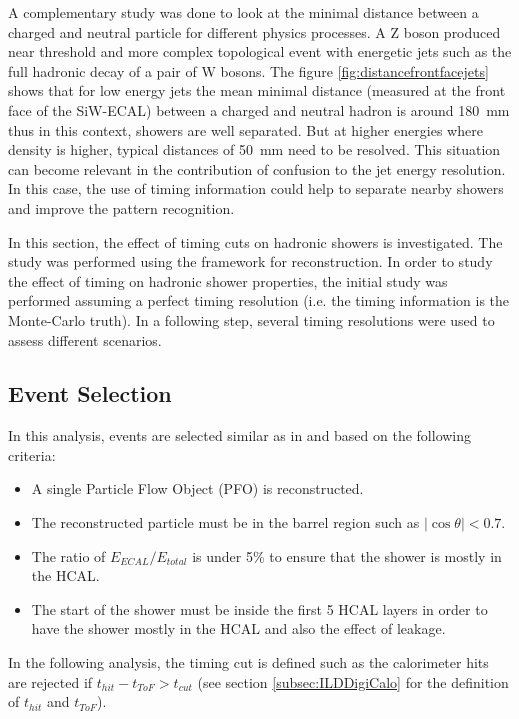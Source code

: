 A complementary study was done to look at the minimal distance between a charged and neutral particle for different physics processes. A Z boson produced near threshold and more complex topological event with energetic jets such as the full hadronic decay of a pair of W bosons. The figure \ref{fig:distancefrontfacejets} shows that for low energy jets the mean minimal distance (measured at the front face of the SiW-ECAL) between a charged and neutral hadron is around \SI{180}{\milli\meter} thus in this context, showers are well separated. But at higher energies where density is higher, typical distances of \SI{50}{\milli\meter} need to be resolved. This situation can become relevant in the contribution of confusion to the jet energy resolution. In this case, the use of timing information could help to separate nearby showers and improve the pattern recognition.

In this section, the effect of timing cuts on hadronic showers is investigated. The study was performed using the \ilcsoft framework for reconstruction. In order to study the effect of timing on hadronic shower properties, the initial study was performed assuming a perfect timing resolution (i.e. the timing information is the Monte-Carlo truth). In a following step, several timing resolutions were used to assess different scenarios.

\subsection{Event Selection}

In this analysis, events are selected similar as in \cite{SoftCompNew2012} and based on the following criteria:
\begin{itemize}
  \item A single Particle Flow Object (PFO) is reconstructed.
  \item The reconstructed particle must be in the barrel region such as $|\cos\theta| < 0.7$.
  \item The ratio of $E_{ECAL}/E_{total}$ is under 5\% to ensure that the shower is mostly in the HCAL.
  \item The start of the shower must be inside the first 5 HCAL layers in order to have the shower mostly in the HCAL and also the effect of leakage.
\end{itemize}

In the following analysis, the timing cut is defined such as the calorimeter hits are rejected if $t_{hit} - t_{ToF} > t_{cut}$ (see section \ref{subsec:ILDDigiCalo} for the definition of $t_{hit}$ and $t_{ToF}$).

